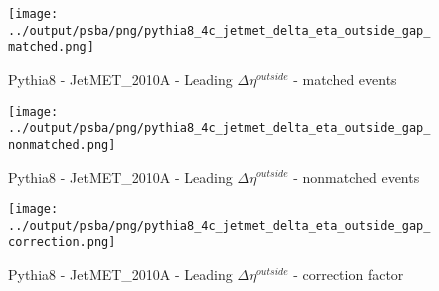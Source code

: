 \documentclass[11pt]{book}
\begin{document}
\begin{figure}[ht]
\centering
\texttt{[image: ../output/psba/png/pythia8\_4c\_jetmet\_delta\_eta\_outside\_gap\_matched.png]}
\caption{Pythia8 - JetMET\_2010A - Leading $\Delta\eta^{outside}$ - matched events}
\label{fig:p8_jetmet_delta_eta_outside_gap_matched}
\end{figure}

\begin{figure}[ht]
\centering
\texttt{[image: ../output/psba/png/pythia8\_4c\_jetmet\_delta\_eta\_outside\_gap\_nonmatched.png]}
\caption{Pythia8 - JetMET\_2010A - Leading $\Delta\eta^{outside}$ - nonmatched events}
\label{fig:p8_jetmet_delta_eta_outside_gap_nonmatched}
\end{figure}

\begin{figure}[ht]
\centering
\texttt{[image: ../output/psba/png/pythia8\_4c\_jetmet\_delta\_eta\_outside\_gap\_correction.png]}
\caption{Pythia8 - JetMET\_2010A - Leading $\Delta\eta^{outside}$ - correction factor}
\label{fig:p8_jetmet_delta_eta_outside_gap_correction}
\end{figure}




\listoffigures

 
\end{document}
